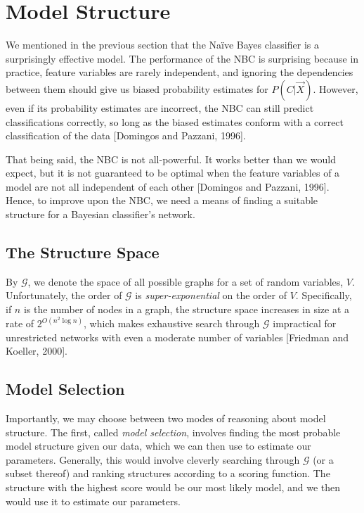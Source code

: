 \documentclass[12pt,twoside]{reedthesis}
\begin{document}
	\section{Model Structure}
	We mentioned in the previous section that the Na\"{i}ve Bayes classifier is a surprisingly effective model. The performance of the NBC is surprising because in practice, feature variables are rarely independent, and ignoring the dependencies between them should give us biased probability estimates for $P(C | \vec{X})$. However, even if its probability estimates are incorrect, the NBC can still predict classifications correctly, so long as the biased estimates conform with a correct classification of the data [Domingos and Pazzani, 1996].
	
	
	That being said, the NBC is not all-powerful. It works better than we would expect, but it is not guaranteed to be optimal when the feature variables of a model are not all independent of each other [Domingos and Pazzani, 1996]. Hence, to improve upon the NBC, we need a means of finding a suitable structure for a Bayesian classifier's network.
	
	\subsection*{The Structure Space}
	By $\mathcal G$, we denote the space of all possible graphs for a set of random variables, $V.$
	Unfortunately, the order of $\mathcal G$ is {\em super-exponential} on the order of $V.$ 
	Specifically, if $n$ is the number of nodes in a graph, the structure space increases in size at a rate of $2^{O(n^2\log{n})}$, which makes exhaustive search through $\mathcal G$ impractical for unrestricted networks with even a moderate number of variables [Friedman and Koeller, 2000].

	\subsection*{Model Selection}	
		Importantly, we may choose between two modes of reasoning about model structure. 
	The first, called {\em model selection}, involves finding the most probable model structure given our data, which we can then use to estimate our parameters. Generally, this would involve cleverly searching through $\mathcal G$ (or a subset thereof) and ranking structures according to a scoring function. The structure with the highest score would be our most likely model, and we then would use it to estimate our parameters.  
	
\end{document}
